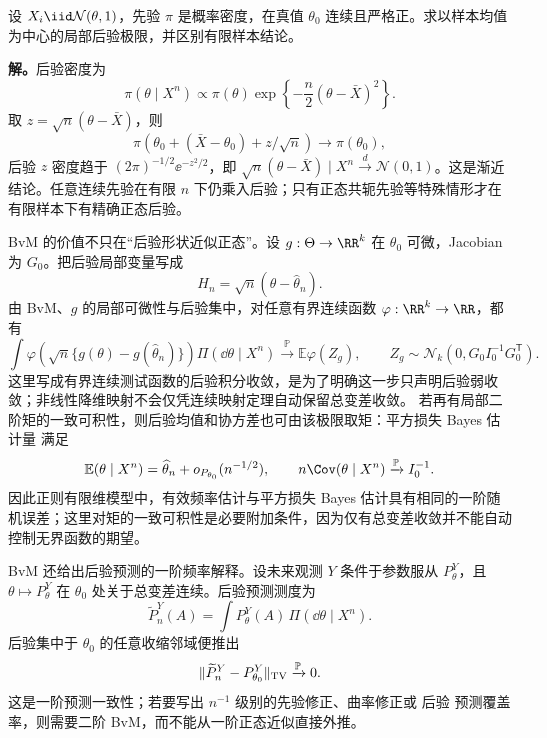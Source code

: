 \begin{workedexample}[正态似然仍须区别有限样本后验]
设 $X_i\iid\mathcal N(\theta,1)$，先验 $\pi$ 是概率密度，在真值 $\theta_0$ 连续且严格正。求以样本均值为中心的局部后验极限，并区别有限样本结论。

\textbf{解。}后验密度为
\[
\pi(\theta\mid X^n)\propto\pi(\theta)\exp\!\left\{-\frac n2(\theta-\bar X)^2\right\}.
\]
取 $z=\sqrt n(\theta-\bar X)$，则
\[
\pi(\theta_0+(\bar X-\theta_0)+z/\sqrt n)\to\pi(\theta_0),
\]
后验 $z$ 密度趋于 $(2\pi)^{-1/2}\ee^{-z^2/2}$，即 $\sqrt n(\theta-\bar X)\mid X^n\xrightarrow{d}\mathcal N(0,1)$。这是渐近结论。任意连续先验在有限 $n$ 下仍乘入后验；只有正态共轭先验等特殊情形才在有限样本下有精确正态后验。
\end{workedexample}

\begin{corollary}
BvM 的价值不只在“后验形状近似正态”。设 $g:\Theta\to\RR^k$ 在 $\theta_0$ 可微，Jacobian 为 $G_0$。把后验局部变量写成
\[
 H_n=\sqrt n(\theta-\widehat\theta_n).
\]
由 BvM、$g$ 的局部可微性与后验集中，对任意有界连续函数 $\varphi:\RR^k\to\RR$，都有
\begin{equation*}\int
 \varphi\!\left(
 \sqrt n\{g(\theta)-g(\widehat\theta_n)\}
 \right)
 \Pi(\dd\theta\mid X^n)
 \xrightarrow{\mathbb P}
 \mathbb E\varphi(Z_g),
 \qquad
 Z_g\sim\mathcal N_k(0,G_0I_0^{-1}G_0^{\mathsf T}).
\end{equation*}
这里写成有界连续测试函数的后验积分收敛，是为了明确这一步只声明后验弱收敛；非线性降维映射不会仅凭连续映射定理自动保留总变差收敛。
若再有局部二阶矩的一致可积性，则后验均值和协方差也可由该极限取矩：平方损失 Bayes 估计量 满足
\[
 \mathbb E(\theta\mid X^n)
 =\widehat\theta_n+o_{P_{\theta_0}}(n^{-1/2}),
 \qquad
 n\Cov(\theta\mid X^n)\xrightarrow{\mathbb P} I_0^{-1}.
\]
因此正则有限维模型中，有效频率估计与平方损失 Bayes 估计具有相同的一阶随机误差；这里对矩的一致可积性是必要附加条件，因为仅有总变差收敛并不能自动控制无界函数的期望。
\end{corollary}

\begin{proposition}[后验预测的一阶一致性]
BvM 还给出后验预测的一阶频率解释。设未来观测 $Y$ 条件于参数服从 $P_\theta^Y$，且 $\theta\mapsto P_\theta^Y$ 在 $\theta_0$ 处关于总变差连续。后验预测测度为
\[
 \widetilde P_n^Y(A)
 =\int P_\theta^Y(A)\,\Pi(\dd\theta\mid X^n).
\]
后验集中于 $\theta_0$ 的任意收缩邻域便推出
\[
 \|\widetilde P_n^Y-P_{\theta_0}^Y\|_{\rm TV}
 \xrightarrow{\mathbb P}0.
\]
这是一阶预测一致性；若要写出 $n^{-1}$ 级别的先验修正、曲率修正或 后验 预测覆盖率，则需要二阶 BvM，而不能从一阶正态近似直接外推。
\end{proposition}

